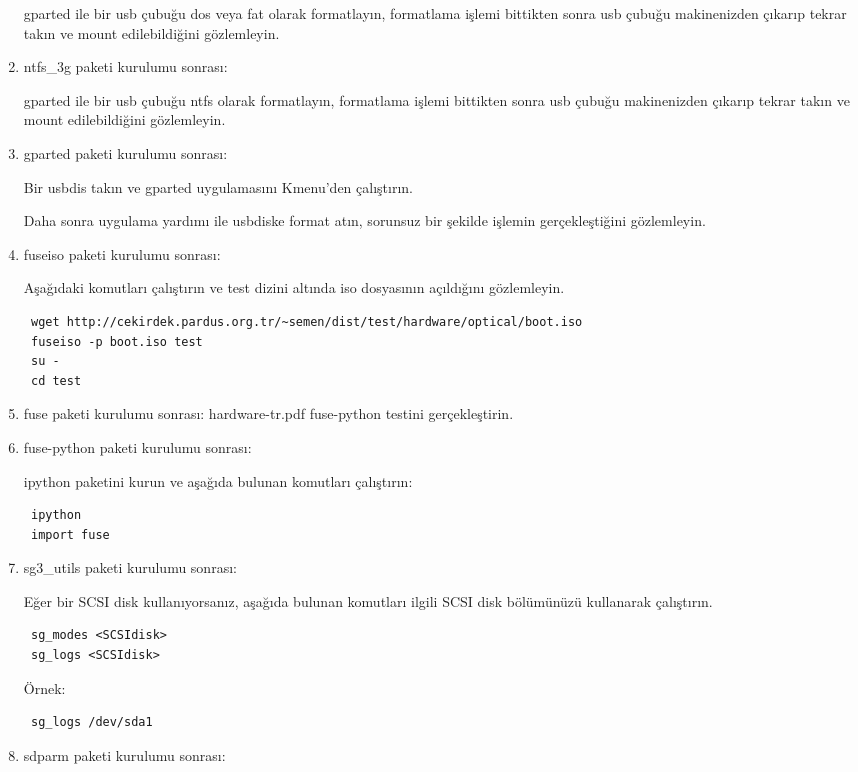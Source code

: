 \documentclass[a4paper,10pt]{article}
\begin{document}
\begin{enumerate}
gparted ile bir usb çubuğu dos veya fat olarak formatlayın, formatlama işlemi bittikten sonra usb çubuğu makinenizden çıkarıp tekrar takın ve mount edilebildiğini gözlemleyin. 

\item ntfs\_3g paketi kurulumu sonrası:

gparted ile bir usb çubuğu ntfs olarak formatlayın, formatlama işlemi bittikten sonra usb çubuğu makinenizden çıkarıp tekrar takın ve mount edilebildiğini gözlemleyin. 

\item gparted paketi kurulumu sonrası:

Bir usbdis takın ve gparted uygulamasını Kmenu'den çalıştırın. 

Daha sonra uygulama yardımı ile usbdiske format atın, sorunsuz bir şekilde işlemin gerçekleştiğini gözlemleyin.

\item fuseiso paketi kurulumu sonrası:

Aşağıdaki komutları çalıştırın ve test dizini altında iso dosyasının açıldığını gözlemleyin.
\begin{verbatim}
 wget http://cekirdek.pardus.org.tr/~semen/dist/test/hardware/optical/boot.iso
 fuseiso -p boot.iso test
 su -
 cd test
\end{verbatim}

\item fuse paketi kurulumu sonrası:
hardware-tr.pdf fuse-python testini gerçekleştirin.

\item fuse-python paketi kurulumu sonrası:

ipython paketini kurun ve aşağıda bulunan komutları çalıştırın:
\begin{verbatim}
 ipython
 import fuse
\end{verbatim}

\item sg3\_utils  paketi kurulumu sonrası:

Eğer bir SCSI disk kullanıyorsanız, aşağıda bulunan komutları ilgili SCSI disk bölümünüzü kullanarak çalıştırın.
\begin{verbatim}
 sg_modes <SCSIdisk>
 sg_logs <SCSIdisk>
\end{verbatim}

Örnek:
\begin{verbatim}
 sg_logs /dev/sda1
\end{verbatim}

\item sdparm paketi kurulumu sonrası:


\end{enumerate}
\end{document}
